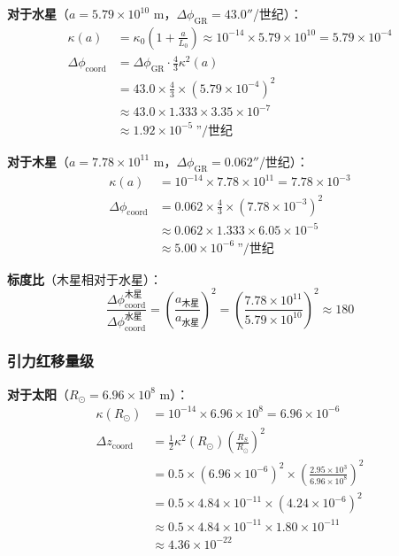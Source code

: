\documentclass[11pt,a4paper]{article}
\begin{document}
	\textbf{对于水星}（$a = 5.79 \times 10^{10}$ m，$\Delta\phi_{\text{GR}} = 43.0''$/世纪）：
	\begin{align}
		\kappa(a) &= \kappa_0 \left(1 + \frac{a}{L_0}\right) 
		\approx 10^{-14} \times 5.79 \times 10^{10} = 5.79 \times 10^{-4} \\
		\Delta\phi_{\text{coord}} &= \Delta\phi_{\text{GR}} \cdot \frac{4}{3} \kappa^2(a) \\
		&= 43.0 \times \frac{4}{3} \times (5.79 \times 10^{-4})^2 \\
		&\approx 43.0 \times 1.333 \times 3.35 \times 10^{-7} \\
		&\approx 1.92 \times 10^{-5} \ \text{''}/\text{世纪}
	\end{align}
	
	\textbf{对于木星}（$a = 7.78 \times 10^{11}$ m，$\Delta\phi_{\text{GR}} = 0.062''$/世纪）：
	\begin{align}
		\kappa(a) &= 10^{-14} \times 7.78 \times 10^{11} = 7.78 \times 10^{-3} \\
		\Delta\phi_{\text{coord}} &= 0.062 \times \frac{4}{3} \times (7.78 \times 10^{-3})^2 \\
		&\approx 0.062 \times 1.333 \times 6.05 \times 10^{-5} \\
		&\approx 5.00 \times 10^{-6}~\text{''}/\text{世纪}
	\end{align}
	
	\textbf{标度比}（木星相对于水星）：
	\begin{equation}
		\frac{\Delta\phi_{\text{coord}}^{\text{木星}}}{\Delta\phi_{\text{coord}}^{\text{水星}}}
		= \left(\frac{a_{\text{木星}}}{a_{\text{水星}}}\right)^2 
		= \left(\frac{7.78 \times 10^{11}}{5.79 \times 10^{10}}\right)^2 \approx 180
	\end{equation}
	
	\subsubsection{引力红移量级}
	
	\textbf{对于太阳}（$R_\odot = 6.96 \times 10^8$ m）：
	\begin{align}
		\kappa(R_\odot) &= 10^{-14} \times 6.96 \times 10^8 = 6.96 \times 10^{-6} \\
		\Delta z_{\text{coord}} &= \frac{1}{2} \kappa^2(R_\odot) \left(\frac{R_S}{R_\odot}\right)^2 \\
		&= 0.5 \times (6.96 \times 10^{-6})^2 \times \left(\frac{2.95 \times 10^3}{6.96 \times 10^8}\right)^2 \\
		&= 0.5 \times 4.84 \times 10^{-11} \times (4.24 \times 10^{-6})^2 \\
		&\approx 0.5 \times 4.84 \times 10^{-11} \times 1.80 \times 10^{-11} \\
		&\approx 4.36 \times 10^{-22}
	\end{align}
	
\end{document}
